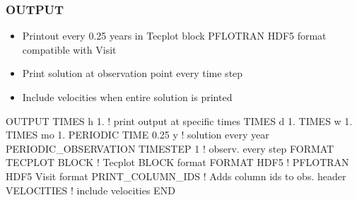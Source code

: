 \documentclass{beamer}
\newcommand\bluecomment[1]{{{\color{blue} #1}}}
\begin{document}
\begin{frame}[fragile]\frametitle{\bf OUTPUT}
\vspace{-1mm}
\begin{itemize}
\item Printout every 0.25 years in Tecplot block PFLOTRAN HDF5 format compatible with Visit
\item Print solution at observation point every time step
\item Include velocities when entire solution is printed
\end{itemize}
\vspace{-4mm}
\begin{semiverbatim}
OUTPUT
  TIMES h  1. \bluecomment{! print output at specific times}
  TIMES d  1.
  TIMES w  1.
  TIMES mo 1.
  PERIODIC TIME 0.25 y     \bluecomment{! solution every year}
  PERIODIC_OBSERVATION TIMESTEP 1  \bluecomment{! observ. every step}
  FORMAT TECPLOT BLOCK \bluecomment{! Tecplot BLOCK format}
  FORMAT HDF5          \bluecomment{! PFLOTRAN HDF5 Visit format}
  PRINT_COLUMN_IDS     \bluecomment{! Adds column ids to obs. header}
  VELOCITIES           \bluecomment{! include velocities}
END
\end{semiverbatim}

\end{frame}
\end{document}
